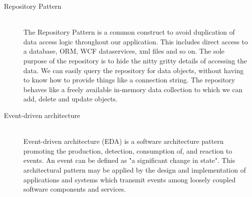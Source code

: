 \begin{description}
 \item[Repository Pattern] \hfill \\
The Repository Pattern is a common construct to avoid duplication of data access logic throughout our application. This includes direct access to a database, ORM, WCF dataservices, xml files and so on. The sole purpose of the repository is to hide the nitty gritty details of accessing the data. We can easily query the repository for data objects, without having to know how to provide things like a connection string. The repository behaves like a freely available in-memory data collection to which we can add, delete and update objects.


 \item[Event-driven architecture] \hfill \\
Event-driven architecture (EDA) is a software architecture pattern promoting the production, detection, consumption of, and reaction to events. An event can be defined as "a significant change in state". This architectural pattern may be applied by the design and implementation of applications and systems which transmit events among loosely coupled software components and services.

\end{description}


\label{chapter:ThisIsMyAppendixChapter}
